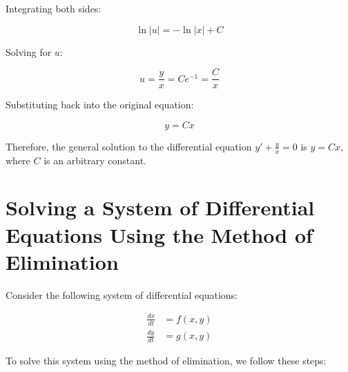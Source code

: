 \documentclass[a4paper,12pt]{article}
\begin{document}
Integrating both sides:

\begin{equation*}
    \ln|u| = -\ln|x| + C
\end{equation*}

Solving for $u$:

\begin{equation*}
    u = \frac{y}{x} = Ce^{-1} = \frac{C}{x}
\end{equation*}

Substituting back into the original equation:

\begin{equation*}
    y = Cx
\end{equation*}

Therefore, the general solution to the differential equation $y' + \frac{y}{x} = 0$ is $y = Cx$, where $C$ is an arbitrary constant.


\section*{Solving a System of Differential Equations Using the Method of Elimination}

Consider the following system of differential equations:

\begin{align*}
\frac{dx}{dt} &= f(x, y) \\
\frac{dy}{dt} &= g(x, y)
\end{align*}

To solve this system using the method of elimination, we follow these steps:
\end{document}
